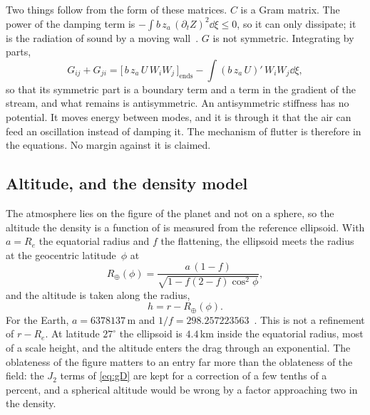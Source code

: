 Two things follow from the form of these matrices. $C$ is a Gram matrix. The
power of the damping term is
$-\int b\,z_a\,(\partial_t Z)^2\dd\xi \le 0$, so it can only dissipate; it
is the radiation of sound by a moving wall~\cite{lighthill1953oscillating}.
$G$ is not symmetric. Integrating by parts,
\[
  G_{ij} + G_{ji}
  = \bigl[\,b\,z_a\,U\,W_iW_j\,\bigr]_{\mathrm{ends}}
    - \int (b\,z_a\,U)'\,W_iW_j\dd\xi ,
\]
so that its symmetric part is a boundary term and a term in the gradient of
the stream, and what remains is antisymmetric. An antisymmetric stiffness
has no potential. It moves energy between modes, and it is through it that
the air can feed an oscillation instead of damping it. The mechanism of
flutter is therefore in the equations. No margin against it is claimed.


\subsection{Altitude, and the density model}\label{sec:density}

The atmosphere lies on the figure of the planet and not on a sphere, so the
altitude the density is a function of is measured from the reference
ellipsoid. With $a = R_e$ the equatorial radius and $f$ the flattening, the
ellipsoid meets the radius at the geocentric latitude~$\phi$ at
\begin{equation}\label{eq:ellipsoid}
  R_\oplus(\phi) = \frac{a\,(1-f)}{\sqrt{1 - f(2-f)\cos^2\phi}} ,
\end{equation}
and the altitude is taken along the radius,
\begin{equation}\label{eq:altitude}
  h = r - R_\oplus(\phi) .
\end{equation}
For the Earth, $a = 6378137$\,m and $1/f = 298.257223563$~\cite{nima2000department}.
This is not a refinement of $r - R_e$. At latitude $27^\circ$ the ellipsoid
is $4.4$\,km inside the equatorial radius, most of a scale height, and the
altitude enters the drag through an exponential. The oblateness of the
figure matters to an entry far more than the oblateness of the field: the
$J_2$ terms of \cref{eq:gD} are kept for a correction of a few tenths of a
percent, and a spherical altitude would be wrong by a factor approaching
two in the density.

